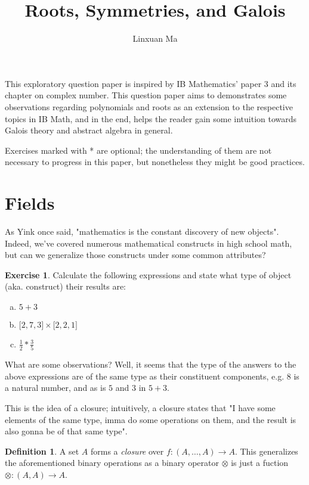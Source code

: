 \documentclass[12pt]{article}
\title{\vspace{-2.0cm}Roots, Symmetries, and Galois}
\author{Linxuan Ma}
\theoremstyle{definition}
\newtheorem{defn}{Definition}[section]
\newtheorem{ex}{Exercise}[section]
\begin{document}
	\maketitle
	
	This exploratory question paper is inspired by IB Mathematics' paper 3 and its chapter on complex number. This question paper aims to demonstrates some observations regarding polynomials and roots as an extension to the respective topics in IB Math, and in the end, helps the reader gain some intuition towards Galois theory and abstract algebra in general.
	
	Exercises marked with * are optional; the understanding of them are not necessary to progress in this paper, but nonetheless they might be good practices.
	
	\section{Fields}
	
	As Yink once said, "mathematics is the constant discovery of new objects". Indeed, we've covered numerous mathematical constructs in high school math, but can we generalize those constructs under some common attributes?
	
	\begin{ex}
		Calculate the following expressions and state what type of object (aka. construct) their results are:
		
		\begin{enumerate}[a.]
			\item $5 + 3$
			\item $\lbrack 2, 7, 3\rbrack \times \lbrack 2, 2, 1\rbrack$
			\item $\frac{1}{2} * \frac{3}{5}$
		\end{enumerate}
	\end{ex}
	
	What are some observations? Well, it seems that the type of the answers to the above expressions are of the same type as their constituent components, e.g. $8$ is a natural number, and as is $5$ and $3$ in $5 + 3$.
	
	This is the idea of a closure; intuitively, a closure states that "I have some elements of the same type, imma do some operations on them, and the result is also gonna be of that same type".
	
	\begin{defn}
		A set $A$ forms a \emph{closure} over $f: (A, \dots, A) \to A$. This generalizes the aforementioned binary operations as a binary operator $\otimes$ is just a fuction $\otimes: (A, A) \to A$.
	\end{defn}
	
\end{document}
